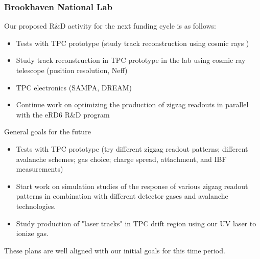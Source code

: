 \subsubsection{Brookhaven National Lab} 

Our proposed R\&D activity for the next funding cycle is as follows:

\begin{itemize}

\item Tests with TPC prototype (study track reconstruction using cosmic rays ) 
\item Study track reconstruction in TPC prototype in the lab using cosmic ray telescope (position resolution, Neff) 
\item TPC electronics (SAMPA, DREAM)
\item Continue work on optimizing the production of zigzag readouts in parallel with the eRD6 R\&D program 
\end{itemize}

General goals for the future

\begin{itemize}
\item Tests with TPC prototype (try different zigzag readout patterns; different avalanche schemes; gas choice; charge spread, attachment, and IBF measurements) 
\item Start work on simulation studies of the response of various zigzag readout patterns in combination with different detector gases and avalanche technologies.  
\item Study production of "laser tracks" in TPC drift region using our UV laser to ionize gas.

\end{itemize}

These plans are well aligned with our initial goals for this time period.